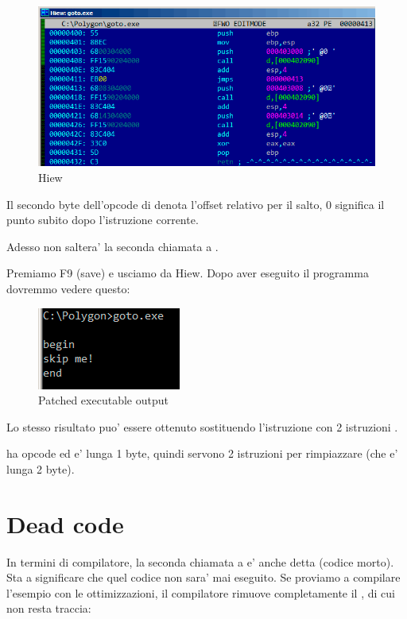 \begin{figure}[H]
\centering
\includegraphics[scale=\FigScale]{patterns/065_GOTO/hiew2.png}
\caption{Hiew}
\label{fig:goto_hiew2}
\end{figure}

Il secondo byte dell'opcode di \JMP denota l'offset relativo per il salto, 0 significa il punto subito dopo l'istruzione corrente.

Adesso \JMP non saltera' la seconda chiamata a \printf.

Premiamo F9 (save) e usciamo da Hiew. Dopo aver eseguito il programma dovremmo vedere questo:

\begin{figure}[H]
\centering
\includegraphics[scale=\NormalScale]{patterns/065_GOTO/result.png}
\caption{Patched executable output}
\label{fig:goto_result}
\end{figure}

Lo stesso risultato puo' essere ottenuto sostituendo l'istruzione \JMP con 2 istruzioni \NOP.

\NOP ha opcode  ed e' lunga 1 byte, quindi servono 2 istruzioni per rimpiazzare \JMP (che e' lunga 2 byte).

\section{Dead code}

In termini di compilatore, la seconda chiamata a \printf e' anche detta  (codice morto).
Sta a significare che quel codice non sara' mai eseguito. Se proviamo a compilare l'esempio con le ottimizzazioni, il compilatore
rimuove completamente il , di cui non resta traccia:

